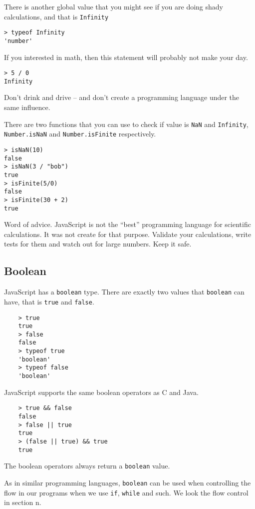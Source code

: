 There is another global value that you might see if you are doing shady calculations, and that is \texttt{Infinity}

\begin{lstlisting}
> typeof Infinity
'number'
\end{lstlisting}

If you interested in math, then this statement will probably not make your day.

\begin{lstlisting}
> 5 / 0
Infinity
\end{lstlisting}

Don't drink and drive -- and don't create a programming language under the same influence.

There are two functions that you can use to check if value is \texttt{NaN} and \texttt{Infinity}, \texttt{Number.isNaN} and \texttt{Number.isFinite} respectively.

\begin{lstlisting}
> isNaN(10)
false
> isNaN(3 / "bob")
true
> isFinite(5/0)
false
> isFinite(30 + 2)
true
\end{lstlisting}

Word of advice. JavaScript is not the ``best'' programming language for scientific calculations. It was not create for that purpose. Validate your calculations, write tests for them and watch out for large numbers. Keep it safe.

\subsection{Boolean}
JavaScript has a \texttt{boolean} type. There are exactly two values that \texttt{boolean} can have, that is \texttt{true} and \texttt{false}.

\begin{lstlisting}
    > true
    true
    > false
    false
    > typeof true
    'boolean'
    > typeof false
    'boolean'
\end{lstlisting}

JavaScript supports the same boolean operators as C and Java.

\begin{lstlisting}
    > true && false
    false
    > false || true
    true
    > (false || true) && true
    true
\end{lstlisting}

The boolean operators always return a \texttt{boolean} value.

As in similar programming languages, \texttt{boolean} can be used when controlling the flow in our programs when we use \texttt{if}, \texttt{while} and such. We look the flow control in section n.


